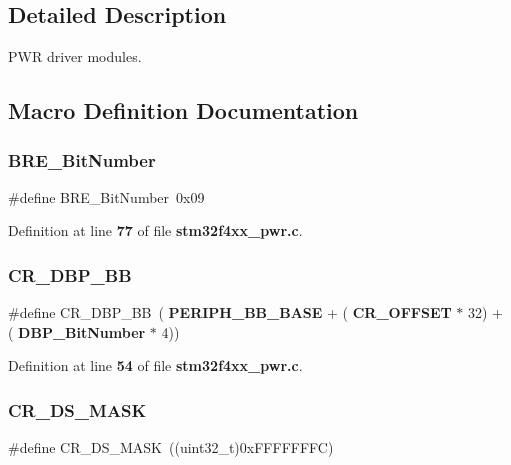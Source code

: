 \subsection{Detailed Description}
P\+WR driver modules. 



\subsection{Macro Definition Documentation}
\mbox{\label{group__PWR_ga1a0832bfe421cdd6f2640ffb625cc2d8}} 
\subsubsection{B\+R\+E\+\_\+\+Bit\+Number}
{\footnotesize\ttfamily \#define B\+R\+E\+\_\+\+Bit\+Number~0x09}



Definition at line \textbf{ 77} of file \textbf{ stm32f4xx\+\_\+pwr.\+c}.

\mbox{\label{group__PWR_ga799ab60bdbcfc1076cf2d7f206d09b0c}} 
\subsubsection{C\+R\+\_\+\+D\+B\+P\+\_\+\+BB}
{\footnotesize\ttfamily \#define C\+R\+\_\+\+D\+B\+P\+\_\+\+BB~(\textbf{ P\+E\+R\+I\+P\+H\+\_\+\+B\+B\+\_\+\+B\+A\+SE} + (\textbf{ C\+R\+\_\+\+O\+F\+F\+S\+ET} $\ast$ 32) + (\textbf{ D\+B\+P\+\_\+\+Bit\+Number} $\ast$ 4))}



Definition at line \textbf{ 54} of file \textbf{ stm32f4xx\+\_\+pwr.\+c}.

\mbox{\label{group__PWR_ga8ee6bf9218f3c476629dd9ee70deef21}} 
\subsubsection{C\+R\+\_\+\+D\+S\+\_\+\+M\+A\+SK}
{\footnotesize\ttfamily \#define C\+R\+\_\+\+D\+S\+\_\+\+M\+A\+SK~((uint32\+\_\+t)0x\+F\+F\+F\+F\+F\+F\+F\+C)}



